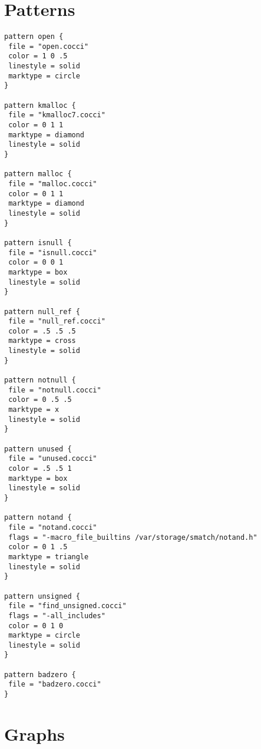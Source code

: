 \section{Patterns}
\label{sec:ex-patterns}

\begin{multicols}{2}
\begin{lstlisting}
pattern open {
 file = "open.cocci"
 color = 1 0 .5
 linestyle = solid
 marktype = circle
}

pattern kmalloc {
 file = "kmalloc7.cocci"
 color = 0 1 1
 marktype = diamond
 linestyle = solid
}

pattern malloc {
 file = "malloc.cocci"
 color = 0 1 1
 marktype = diamond
 linestyle = solid
}

pattern isnull {
 file = "isnull.cocci"
 color = 0 0 1
 marktype = box
 linestyle = solid
}

pattern null_ref {
 file = "null_ref.cocci"
 color = .5 .5 .5
 marktype = cross
 linestyle = solid
}

pattern notnull {
 file = "notnull.cocci"
 color = 0 .5 .5
 marktype = x
 linestyle = solid
}

pattern unused {
 file = "unused.cocci"
 color = .5 .5 1
 marktype = box
 linestyle = solid
}

pattern notand {
 file = "notand.cocci"
 flags = "-macro_file_builtins /var/storage/smatch/notand.h"
 color = 0 1 .5
 marktype = triangle
 linestyle = solid
}

pattern unsigned {
 file = "find_unsigned.cocci"
 flags = "-all_includes"
 color = 0 1 0
 marktype = circle
 linestyle = solid
}

pattern badzero {
 file = "badzero.cocci"
}
\end{lstlisting}
\end{multicols}

\section{Graphs}
\label{sec:ex-graphs}

